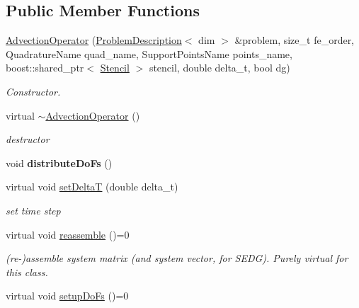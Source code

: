 \subsection*{Public Member Functions}
\begin{DoxyCompactItemize}
\item 
\hyperlink{classnatrium_1_1AdvectionOperator_a89843b1b14386e984a5dab59b0a602b4}{AdvectionOperator} (\hyperlink{classnatrium_1_1ProblemDescription}{ProblemDescription}$<$ dim $>$ \&problem, size\_\-t fe\_\-order, QuadratureName quad\_\-name, SupportPointsName points\_\-name, boost::shared\_\-ptr$<$ \hyperlink{classnatrium_1_1Stencil}{Stencil} $>$ stencil, double delta\_\-t, bool dg)
\begin{DoxyCompactList}\small\item\em Constructor. \item\end{DoxyCompactList}\item 
\hypertarget{classnatrium_1_1AdvectionOperator_a691156dace41e3075fd89953f30ae83f}{
virtual \hyperlink{classnatrium_1_1AdvectionOperator_a691156dace41e3075fd89953f30ae83f}{$\sim$AdvectionOperator} ()}
\label{classnatrium_1_1AdvectionOperator_a691156dace41e3075fd89953f30ae83f}

\begin{DoxyCompactList}\small\item\em destructor \item\end{DoxyCompactList}\item 
\hypertarget{classnatrium_1_1AdvectionOperator_a63ea65f840743d1b75d529ea4c91d4b0}{
void {\bfseries distributeDoFs} ()}
\label{classnatrium_1_1AdvectionOperator_a63ea65f840743d1b75d529ea4c91d4b0}

\item 
virtual void \hyperlink{classnatrium_1_1AdvectionOperator_a640db5be4d4930198124fa57752167e5}{setDeltaT} (double delta\_\-t)
\begin{DoxyCompactList}\small\item\em set time step \item\end{DoxyCompactList}\item 
\hypertarget{classnatrium_1_1AdvectionOperator_a89c25c3dae9a1e5973cd89fab8c2c052}{
virtual void \hyperlink{classnatrium_1_1AdvectionOperator_a89c25c3dae9a1e5973cd89fab8c2c052}{reassemble} ()=0}
\label{classnatrium_1_1AdvectionOperator_a89c25c3dae9a1e5973cd89fab8c2c052}

\begin{DoxyCompactList}\small\item\em (re-\/)assemble system matrix (and system vector, for SEDG). Purely virtual for this class. \item\end{DoxyCompactList}\item 
\hypertarget{classnatrium_1_1AdvectionOperator_adcd3e1a5bfd9fc4bc2bbc09c02c0f248}{
virtual void \hyperlink{classnatrium_1_1AdvectionOperator_adcd3e1a5bfd9fc4bc2bbc09c02c0f248}{setupDoFs} ()=0}
\label{classnatrium_1_1AdvectionOperator_adcd3e1a5bfd9fc4bc2bbc09c02c0f248}


\end{DoxyCompactItemize}
